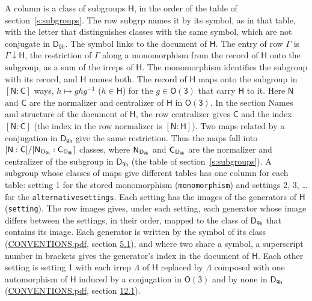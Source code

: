 \documentclass[10pt,a4paper]{article}
\numberwithin{equation}{section}
\newcommand{\grp}[1]{\mathsf{#1}}
\newcommand{\grpindex}[2]{[#1 : #2]}
\newcommand{\restr}[2]{#1\!\downarrow#2}
\newcommand{\hairsp}{\mkern1mu}
\begin{document}
A column is a class of subgroups $\grp{H}$, in the order of the table of section~\ref{s:subgroups}. The row subgrp names it by its symbol, as in that table, with the letter that distinguishes classes with the same symbol, which are not conjugate in $\grp{D_{9h}}$. The symbol links to the document of $\grp{H}$. The entry of row $\Gamma$ is $\restr{\Gamma}{\grp{H}}$, the restriction of $\Gamma$ along a monomorphism from the record of $\grp{H}$ onto the subgroup, as a sum of the irreps of $\grp{H}$. The monomorphism identifies the subgroup with its record, and $\grp{H}$ names both. \label{n:group.normalizer.o3}\label{n:group.centralizer.o3}The record of $\grp{H}$ maps onto the subgroup in $\grpindex{\grp{N}}{\grp{C}}$ ways, $h \mapsto g h g^{-1}$ ($h \in \grp{H}$) for the $g \in \grp{O(3)}$ that carry $\grp{H}$ to it. Here $\grp{N}$ and $\grp{C}$ are the normalizer and centralizer of $\grp{H}$ in \href{O3.pdf}{$\grp{O(3)}$}. In the section Names and structure of the document of $\grp{H}$, the row centralizer gives $\grp{C}$ and the index $\grpindex{\grp{N}}{\grp{C}}$ (the index in the row normalizer is $\grpindex{\grp{N}}{\grp{H}}$). Two maps related by a conjugation in $\grp{D_{9h}}$ give the same restriction. Thus the maps fall into $\grpindex{\grp{N}}{\grp{C}}/\grpindex{\grp{N}_{\hairsp \grp{D_{9h}}}}{\grp{C}_{\hairsp \grp{D_{9h}}}}$ classes, where $\grp{N}_{\hairsp \grp{D_{9h}}}$ and $\grp{C}_{\hairsp \grp{D_{9h}}}$ are the normalizer and centralizer of the subgroup in $\grp{D_{9h}}$ (the table of section~\ref{s:subgroups}). \label{n:head.setting}A subgroup whose classes of maps give different tables has one column for each table: setting 1 for the stored monomorphism (\texttt{monomorphism}) and settings 2, 3, \dots{} for the \texttt{alternativesettings}. Each setting has the images of the generators of $\grp{H}$ (\texttt{setting}). \label{n:head.images}The row images gives, under each setting, each generator whose image differs between the settings, in their order, mapped to the class of $\grp{D_{9h}}$ that contains its image. Each generator is written by the symbol of its class (\href{../../CONVENTIONS.pdf}{CONVENTIONS.pdf}, section \href{../../CONVENTIONS.pdf\#conv.5.1}{5.1}), and where two share a symbol, a superscript number in brackets gives the generator's index in the document of $\grp{H}$. \label{n:irrep.Delta}Each other setting is setting 1 with each irrep $\Lambda$ of $\grp{H}$ replaced by $\Lambda$ composed with one automorphism of $\grp{H}$ induced by a conjugation in \href{O3.pdf}{$\grp{O(3)}$} and by none in $\grp{D_{9h}}$ (\href{../../CONVENTIONS.pdf}{CONVENTIONS.pdf}, section \href{../../CONVENTIONS.pdf\#conv.12.1}{12.1}).
\end{document}
